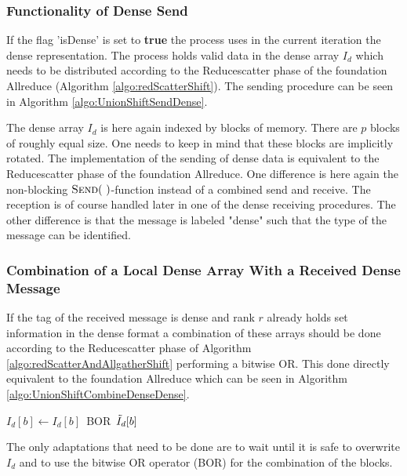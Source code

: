 \subsubsection{Functionality of Dense Send} \label{sec:denseSendUnionShift}
If the flag 'isDense' is set to \textbf{true} the process uses in the current iteration the dense representation. The process holds valid data in the dense array $I_d$ which needs to be distributed according to the Reducescatter phase of the foundation Allreduce (Algorithm \ref{algo:redScatterShift}). The sending procedure can be seen in Algorithm \ref{algo:UnionShiftSendDense}.
\begin{algorithm}[htb]
	\caption{Send dense representation.} \label{algo:UnionShiftSendDense}
	\begin{algorithmic}[1]
		\State {}
		\EndProcedure
	\end{algorithmic}
\end{algorithm}
The dense array $I_d$ is here again indexed by blocks of memory. There are $p$ blocks of roughly equal size. One needs to keep in mind that these blocks are implicitly rotated. The implementation of the sending of dense data is equivalent to the Reducescatter phase of the foundation Allreduce. One difference is here again the non-blocking $\Call{Send}{~}$-function instead of a combined send and receive. The reception is of course handled later in one of the dense receiving procedures. The other difference is that the message is labeled "dense" such that the type of the message can be identified. 

\subsubsection{Combination of a Local Dense Array With a Received Dense Message}
If the tag of the received message is dense and rank $r$ already holds set information in the dense format a combination of these arrays should be done according to the Reducescatter phase of Algorithm \ref{algo:redScatterAndAllgatherShift} performing a bitwise OR. This done directly equivalent to the foundation Allreduce which can be seen in Algorithm \ref{algo:UnionShiftCombineDenseDense}.
\begin{algorithm}[htb]
	\caption{Combine local dense array with a received dense array.} \label{algo:UnionShiftCombineDenseDense}
	\begin{algorithmic}[1]
			\State  {}
			\State {}
			\State $I_d[b]\gets I_d[b] $~BOR~$ \Tilde{I}_d[b]$
			\EndFor
		\EndProcedure
	\end{algorithmic}
\end{algorithm}
The only adaptations that need to be done are to wait until it is safe to overwrite $I_d$ and to use the bitwise OR operator (BOR) for the combination of the blocks.

